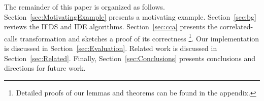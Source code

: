 The remainder of this paper is organized as follows.
%
Section~\ref{sec:MotivatingExample} presents a motivating example.
%
Section~\ref{sec:bg} reviews the IFDS and IDE algorithms.
%
Section~\ref{sec:cca} presents the correlated-calls transformation
and sketches a proof of its correctness%
\footnote{
  Detailed proofs of our lemmas and theorems can be found in
  the appendix.
}.
%
Our implementation is discussed in Section~\ref{sec:Evaluation}.
%
Related work is discussed in Section~\ref{sec:Related}.
%
Finally, Section~\ref{sec:Conclusions} presents conclusions and directions for future work.

 
 
